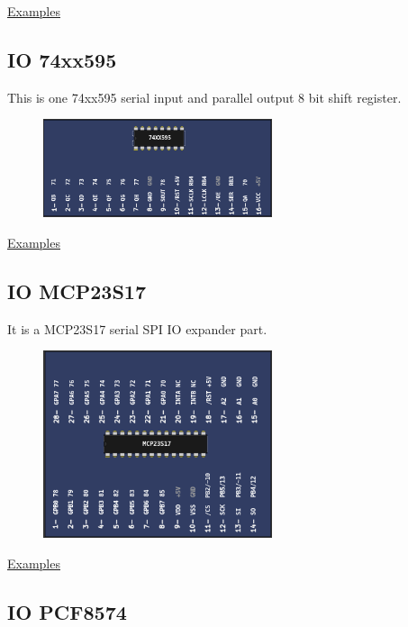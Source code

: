 \href{https://lcgamboa.github.io/picsimlab_examples/examples/examples_index.html\#ETH\_w5500}{Examples}
 

\subsection{IO 74xx595}

This is one 74xx595 serial input and parallel output 8 bit shift register.

\begin{figure}[H]
\center
\includegraphics[width=0.6\textwidth]{img/part_74xx595.png} 
\end{figure} 

\href{https://lcgamboa.github.io/picsimlab_examples/examples/examples_index.html\#IO\_74xx595}{Examples}

\subsection{IO MCP23S17}

It is a MCP23S17 serial SPI IO expander part.

\begin{figure}[H]
\center
\includegraphics[width=0.6\textwidth]{img/part_MCP23S17.png} 
\end{figure} 

\href{https://lcgamboa.github.io/picsimlab_examples/examples/examples_index.html\#IO\_MCP23S17}{Examples}

\subsection{IO PCF8574}

